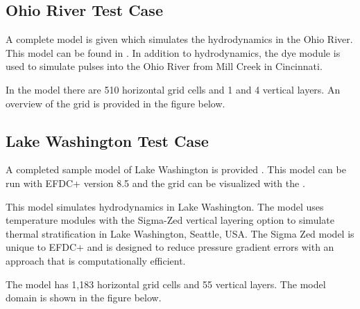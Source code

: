 \documentclass[letterpaper,10pt,english]{sphinxmanual}
\begin{document}


\subsection{Ohio River Test Case}
\label{\detokenize{samplemodels/ohio_river:ohio-river-test-case}}\label{\detokenize{samplemodels/ohio_river:ohio-river}}\label{\detokenize{samplemodels/ohio_river::doc}}
A complete model is given which simulates the hydrodynamics in the Ohio River. This model can be found in . In addition to hydrodynamics, the dye module is used to simulate pulses into the Ohio River from Mill Creek in Cincinnati.

In the model there are 510 horizontal grid cells and 1 and 4 vertical layers.  An overview of the grid is provided in the figure below.



\subsection{Lake Washington Test Case}
\label{\detokenize{samplemodels/lake_washington:lake-washington-test-case}}\label{\detokenize{samplemodels/lake_washington:lake-washington}}\label{\detokenize{samplemodels/lake_washington::doc}}
A completed sample model of Lake Washington is provided .  This model can be run with EFDC+ version 8.5 and the grid can be visualized with the .

This model simulates hydrodynamics in Lake Washington. The model uses temperature modules with the Sigma-Zed vertical layering option to simulate thermal stratification in Lake Washington, Seattle, USA. The Sigma Zed model is unique to EFDC+ and is designed to reduce pressure gradient errors with an approach that is computationally efficient.

The model has 1,183 horizontal grid cells and 55 vertical layers.  The model domain is shown in the figure below.

\end{document}
